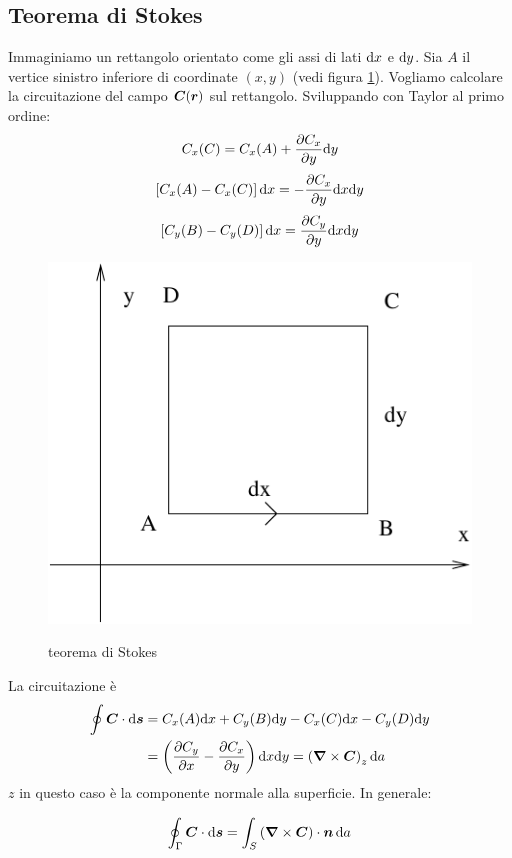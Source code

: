 \subsection{Teorema di Stokes}
Immaginiamo un rettangolo orientato come gli assi di lati $\mathrm{d} x$ e $\mathrm{d} y$. Sia $A$ il vertice sinistro inferiore di coordinate $(x,y)$ (vedi figura \ref{stokes_ret}). Vogliamo calcolare la circuitazione del campo $\boldsymbol{C}(\boldsymbol{r})$ sul rettangolo. Sviluppando con Taylor al primo ordine:
\begin{equation*}C_x(C)=C_x(A)+\frac{\partial C_x}{\partial y}\mathrm{d} y\end{equation*}
\begin{equation*}\left[C_x(A)-C_x(C)\right]\mathrm{d} x=-\frac{\partial C_x}{\partial y}\mathrm{d} x\mathrm{d} y\end{equation*}
\begin{equation*}\left[C_y(B)-C_y(D)\right]\mathrm{d} x=\frac{\partial C_y}{\partial y}\mathrm{d} x\mathrm{d} y\end{equation*}
\begin{figure}[htbp]
\centering
\includegraphics[scale=0.8]{immagini/fisica2/stockes_ret}
\label{stokes_ret}
\caption{teorema di Stokes}
\end{figure}
La circuitazione è 
\begin{align*}
\oint \boldsymbol{C}\cdot\mathrm{d}\boldsymbol{s}&=C_x(A)\mathrm{d} x+C_y(B)\mathrm{d} y-C_x(C)\mathrm{d} x-C_y(D)\mathrm{d} y
\\
&=\left(\frac{\partial C_y}{\partial x}-\frac{\partial C_x}{\partial y}\right)\mathrm{d} x\mathrm{d} y=\left(\boldsymbol{\nabla}\times\boldsymbol{C}\right)_z\mathrm{d} a
\end{align*}
$z$ in questo caso è la componente normale alla superficie. In generale:
\begin{Teo}[Stokes]
\begin{equation}
\oint_\Gamma\boldsymbol{C}\cdot\mathrm{d}\boldsymbol{s}=\int_S\left(\boldsymbol{\nabla}\times\boldsymbol{C}\right)\cdot\boldsymbol{n}\,\mathrm{d} a
\end{equation}
\end{Teo}

